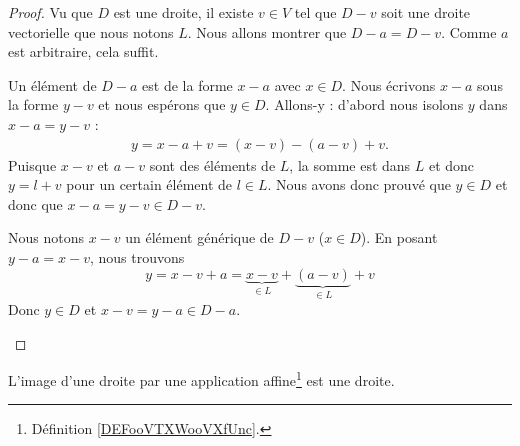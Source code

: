 \begin{proof}
	Vu que \( D\) est une droite, il existe \( v\in V\) tel que \( D-v\) soit une droite vectorielle que nous notons \( L\). Nous allons montrer que \( D-a=D-v\). Comme \( a\) est arbitraire, cela suffit.

	\begin{subproof}
		\spitem[\( D-a\subset D-v\)]
		Un élément de \( D-a\) est de la forme \( x-a\) avec \( x\in D\). Nous écrivons \( x-a\) sous la forme \( y-v\) et nous espérons que \( y\in D\). Allons-y : d'abord nous isolons \( y\) dans \( x-a=y-v\) :
		\begin{subequations}
			\begin{align}
				y=x-a+v=(x-v)-(a-v)+v.
			\end{align}
		\end{subequations}
		Puisque \( x-v\) et \( a-v\) sont des éléments de \( L\), la somme est dans \( L\) et donc \( y=l+v\) pour un certain élément de \( l\in L\). Nous avons donc prouvé que \( y\in D\) et donc que \( x-a=y-v\in D-v\).

		\spitem[\( D-v\subset D-a\)]
		Nous notons \( x-v\) un élément générique de \( D-v\) (\( x\in D\)). En posant \( y-a=x-v\), nous trouvons
		\begin{equation}
			y=x-v+a=\underbrace{x-v}_{\in L}+\underbrace{(a-v)}_{\in L}+v
		\end{equation}
		Donc \( y\in D\) et \( x-v=y-a\in D-a\).
	\end{subproof}
\end{proof}

\begin{proposition}     \label{PROPooNTHVooWWyafJ}
	L'image d'une droite par une application affine\footnote{Définition \ref{DEFooVTXWooVXfUnc}.} est une droite.
\end{proposition}

